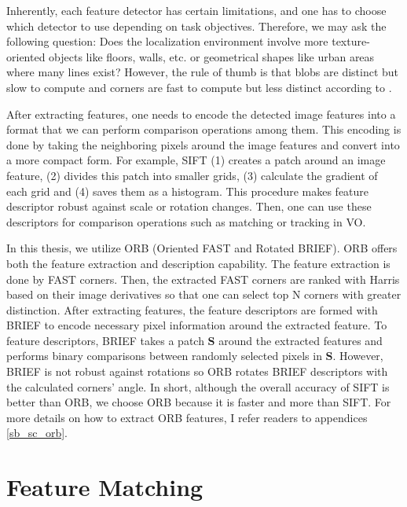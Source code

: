 \documentclass[a4paper]{report}
\numberwithin{figure}{section}
\begin{document}
Inherently, each feature detector has certain limitations, and one has to 
choose which detector to use depending on task objectives. Therefore, we may 
ask the following question: Does the localization environment involve more 
texture-oriented objects like floors, walls, etc. or geometrical shapes like 
urban areas where many lines exist?  However, the rule of thumb is that blobs 
are distinct but slow to compute and corners are fast to compute but less 
distinct according to \parencite{Fraundorfer2012}. 

After extracting features, one needs to encode the detected image features 
into a format that we can perform comparison operations among them. 
This encoding is done by taking the neighboring pixels around the image 
features and 
convert into a more compact form. For example, SIFT (1) creates a patch around 
an 
image feature, (2) divides this patch into 
smaller grids, (3) calculate the gradient of each grid and (4) saves them as a 
histogram.  This procedure makes feature descriptor robust against scale or 
rotation changes. Then, one can use these descriptors for comparison 
operations such as matching or tracking in VO. 

In this thesis, we utilize ORB (Oriented FAST and Rotated BRIEF). ORB offers 
both the feature extraction and description capability. The feature 
extraction is done by FAST corners. Then, the extracted FAST corners are 
ranked with Harris based on their image derivatives so that one can select 
top N corners with greater distinction. After extracting features, the 
feature descriptors are formed with BRIEF to encode necessary pixel 
information around the extracted feature. To feature descriptors, BRIEF takes 
a patch $\mathbf{S}$ around the extracted features and performs binary 
comparisons between randomly selected pixels in $\mathbf{S}$. 
However, BRIEF is not robust against rotations so ORB rotates BRIEF 
descriptors with the calculated corners' angle. In short, although the overall 
accuracy 
of SIFT is better than ORB, we choose ORB because it is faster and more than 
SIFT. For more details on how to extract ORB features, I refer readers to 
appendices \ref{sb_sc_orb}.


\section{Feature Matching} \label{sc_feature_matching}
\end{document}
